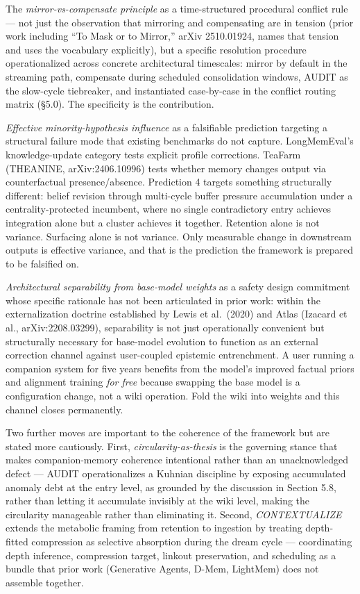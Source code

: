 \documentclass[
  11pt,
]{article}
\begin{document}
The \emph{mirror-vs-compensate principle} as a time-structured
procedural conflict rule --- not just the observation that mirroring and
compensating are in tension (prior work including ``To Mask or to
Mirror,'' arXiv 2510.01924, names that tension and uses the vocabulary
explicitly), but a specific resolution procedure operationalized across
concrete architectural timescales: mirror by default in the streaming
path, compensate during scheduled consolidation windows, AUDIT as the
slow-cycle tiebreaker, and instantiated case-by-case in the conflict
routing matrix (§5.0). The specificity is the contribution.

\emph{Effective minority-hypothesis influence} as a falsifiable
prediction targeting a structural failure mode that existing benchmarks
do not capture. LongMemEval's knowledge-update category tests explicit
profile corrections. TeaFarm (THEANINE, arXiv:2406.10996) tests whether
memory changes output via counterfactual presence/absence. Prediction 4
targets something structurally different: belief revision through
multi-cycle buffer pressure accumulation under a centrality-protected
incumbent, where no single contradictory entry achieves integration
alone but a cluster achieves it together. Retention alone is not
variance. Surfacing alone is not variance. Only measurable change in
downstream outputs is effective variance, and that is the prediction the
framework is prepared to be falsified on.

\emph{Architectural separability from base-model weights} as a safety
design commitment whose specific rationale has not been articulated in
prior work: within the externalization doctrine established by Lewis et
al.~(2020) and Atlas (Izacard et al., arXiv:2208.03299), separability is
not just operationally convenient but structurally necessary for
base-model evolution to function as an external correction channel
against user-coupled epistemic entrenchment. A user running a companion
system for five years benefits from the model's improved factual priors
and alignment training \emph{for free} because swapping the base model
is a configuration change, not a wiki operation. Fold the wiki into
weights and this channel closes permanently.

Two further moves are important to the coherence of the framework but
are stated more cautiously. First, \emph{circularity-as-thesis} is the
governing stance that makes companion-memory coherence intentional
rather than an unacknowledged defect --- AUDIT operationalizes a Kuhnian
discipline by exposing accumulated anomaly debt at the entry level, as
grounded by the discussion in Section 5.8, rather than letting it
accumulate invisibly at the wiki level, making the circularity
manageable rather than eliminating it. Second, \emph{CONTEXTUALIZE}
extends the metabolic framing from retention to ingestion by treating
depth-fitted compression as selective absorption during the dream cycle
--- coordinating depth inference, compression target, linkout
preservation, and scheduling as a bundle that prior work (Generative
Agents, D-Mem, LightMem) does not assemble together.
\end{document}
